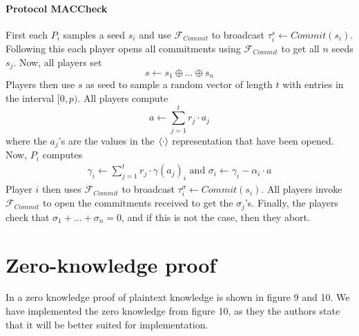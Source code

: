 \documentclass[../main.tex]{subfiles}
\begin{document}
\paragraph{Protocol MACCheck}
First each $P_i$ samples a seed $s_i$ and use $\mathcal{F}_{Commit}$ to broadcast $\tau^s_i \leftarrow Commit(s_i)$. Following this each player opens all commitments using $\mathcal{F}_{Commit}$ to get all $n$ seeds $s_j$. Now, all players set $$s \leftarrow s_1 \oplus ... \oplus s_n$$
Players then use $s$ as seed to sample a random vector of length $t$ with entries in the interval $[0, p)$.
All players compute $$a \leftarrow \sum^t_{j = 1} r_j \cdot a_j$$ where the $a_j$'s are the values in the $\left\langle \cdot \right\rangle$ representation that have been opened.
Now, $P_i$ computes
\begin{align*}
    \gamma_i \leftarrow \sum^t_{j = 1} r_j \cdot \gamma(a_j)_i \text{  and  } \sigma_i \leftarrow \gamma_i - \alpha_i \cdot a
\end{align*}
Player $i$ then uses $\mathcal{F}_{Commit}$ to broadcast $\tau^\sigma_i \leftarrow Commit(s_i)$.
All players invoke $\mathcal{F}_{Commit}$ to open the commitments received to get the $\sigma_j$'s.
Finally, the players check that $\sigma_1 + ... + \sigma_n = 0$, and if this is not the case, then they abort.

\section{Zero-knowledge proof} \label{sec:zkpopk-theory}
    In \cite{damgaard2012multiparty} a zero knowledge proof of plaintext knowledge is shown in figure 9 and 10.
    We have implemented the zero knowledge from figure 10, as they the authors state that it will be better suited for implementation.
\end{document}
